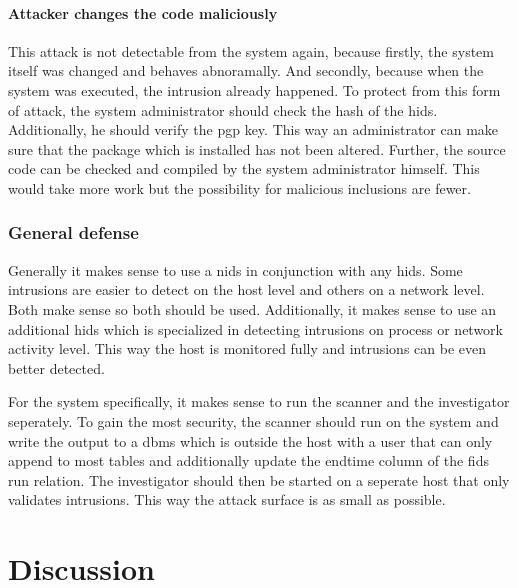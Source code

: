 \documentclass[
	a4paper,					%
	10pt,							%
	twoside,					%
	openright,				%
	notitlepage,			%
	parskip=half,			%
]{scrreprt}					%
\begin{document}
\subsubsection{Attacker changes the code maliciously}
\label{sec:defense:codechange}

This attack is not detectable from the system again, because firstly, the system itself was changed and behaves abnoramally. And secondly, because when the system was executed, the intrusion already happened. To protect from this form of attack, the system administrator should check the hash of the \gls{hids}. Additionally, he should verify the \gls{pgp} key. This way an administrator can make sure that the package which is installed has not been altered. Further, the source code can be checked and compiled by the system administrator himself. This would take more work but the possibility for malicious inclusions are fewer. 

\subsection{General defense}
\label{sec:defense:general}

Generally it makes sense to use a \gls{nids} in conjunction with any \gls{hids}. Some intrusions are easier to detect on the host level and others on a network level. Both make sense so both should be used. Additionally, it makes sense to use an additional \gls{hids} which is specialized in detecting intrusions on process or network activity level. This way the host is monitored fully and intrusions can be even better detected. 

For the system specifically, it makes sense to run the scanner and the investigator seperately. To gain the most security, the scanner should run on the system and write the output to a \gls{dbms} which is outside the host with a user that can only append to most tables and additionally update the endtime column of the fids run relation. The investigator should then be started on a seperate host that only validates intrusions. This way the attack surface is as small as possible. 

\chapter{Discussion}
\label{sec:Discussion}
\end{document}
